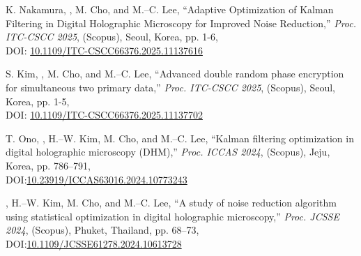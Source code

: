 \documentclass[a4paper,9pt]{extarticle}
\begin{document}
\begin{enumerate}[label={[\arabic*]}, start=1]
    \item 
    K. Nakamura, , M. Cho, and M.--C. Lee, 
    ``Adaptive Optimization of Kalman Filtering in Digital Holographic Microscopy for Improved Noise Reduction,'' 
    \textit{Proc. ITC-CSCC 2025}, (Scopus),
    Seoul, Korea, 
    pp. 1-6, \\
    DOI: \href{https://doi.org/10.1109/ITC-CSCC66376.2025.11137616}{10.1109/ITC-CSCC66376.2025.11137616}
    
    \item 
    S. Kim, , M. Cho, and M.--C. Lee, 
    ``Advanced double random phase encryption for simultaneous two primary data,'' 
    \textit{Proc. ITC-CSCC 2025}, (Scopus),
    Seoul, Korea,
    pp. 1-5, \\
    DOI: \href{https://doi.org/10.1109/ITC-CSCC66376.2025.11137702}{10.1109/ITC-CSCC66376.2025.11137702}
    
    \item 
    T. Ono, , H.--W. Kim, M. Cho, and M.--C. Lee, 
    ``Kalman filtering optimization in digital holographic microscopy (DHM),'' 
    \textit{Proc. ICCAS 2024}, (Scopus),
    Jeju, Korea, pp. 786--791, \\
    DOI:\href{https://doi.org/10.23919/ICCAS63016.2024.10773243}{10.23919/ICCAS63016.2024.10773243} 
    
    \item 
    , H.--W. Kim, M. Cho, and M.--C. Lee, 
    ``A study of noise reduction algorithm using statistical optimization in digital holographic microscopy,'' 
    \textit{Proc. JCSSE 2024}, (Scopus),
    Phuket, Thailand, pp. 68--73, \\
    DOI:\href{https://doi.org/10.1109/JCSSE61278.2024.10613728}{10.1109/JCSSE61278.2024.10613728} \\
    
    
\end{enumerate} 
\end{document}
